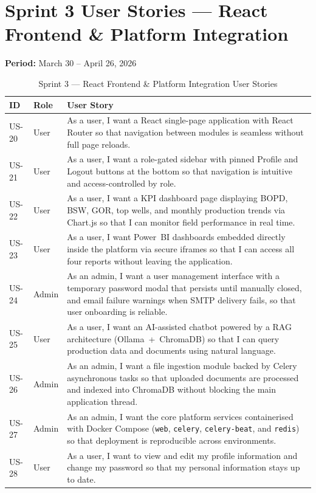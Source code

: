 \section{Sprint 3 User Stories --- React Frontend \& Platform Integration}
\begin{sloppypar}

\textbf{Period:} March 30 -- April 26, 2026

\begin{table}[H]
\caption{Sprint 3 --- React Frontend \& Platform Integration User Stories}
\centering
\renewcommand{\arraystretch}{1.5}
\begin{tabular}{|p{2cm}|p{2cm}|p{9.5cm}|}
\hline
\rowcolor{blue!15}
\textbf{ID} & \textbf{Role} & \textbf{User Story} \\ \hline
US-20 & User &
  As a user, I want a React single-page application with React Router so that
  navigation between modules is seamless without full page reloads. \\ \hline
\rowcolor{gray!10}
US-21 & User &
  As a user, I want a role-gated sidebar with pinned Profile and Logout buttons
  at the bottom so that navigation is intuitive and access-controlled by
  role. \\ \hline
US-22 & User &
  As a user, I want a KPI dashboard page displaying BOPD, BSW, GOR, top wells,
  and monthly production trends via Chart.js so that I can monitor field
  performance in real time. \\ \hline
\rowcolor{gray!10}
US-23 & User &
  As a user, I want Power~BI dashboards embedded directly inside the platform
  via secure iframes so that I can access all four reports without leaving the
  application. \\ \hline
US-24 & Admin &
  As an admin, I want a user management interface with a temporary password modal
  that persists until manually closed, and email failure warnings when SMTP
  delivery fails, so that user onboarding is reliable. \\ \hline
\rowcolor{gray!10}
US-25 & User &
  As a user, I want an AI-assisted chatbot powered by a RAG architecture
  (Ollama~+~ChromaDB) so that I can query production data and documents using
  natural language. \\ \hline
US-26 & Admin &
  As an admin, I want a file ingestion module backed by Celery asynchronous
  tasks so that uploaded documents are processed and indexed into ChromaDB
  without blocking the main application thread. \\ \hline
\rowcolor{gray!10}
US-27 & Admin &
  As an admin, I want the core platform services containerised with Docker
  Compose (\texttt{web}, \texttt{celery}, \texttt{celery-beat}, and
  \texttt{redis}) so that deployment is reproducible across
  environments. \\ \hline
US-28 & User &
  As a user, I want to view and edit my profile information and change my
  password so that my personal information stays up to date. \\ \hline
\end{tabular}
\end{table}


\end{sloppypar}
